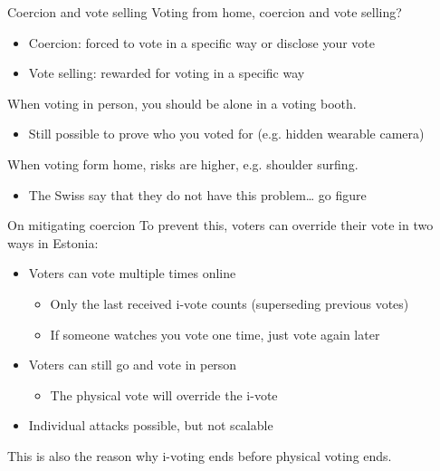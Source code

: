 \begin{frame}{Coercion and vote selling}
  Voting from home, coercion and vote selling?
  \begin{itemize}[<+(1)->]
    \item Coercion: forced to vote in a specific way or disclose your vote
    \item Vote selling: rewarded for voting in a specific way
  \end{itemize}

  \vspace*{1em}

  \pause
  When voting in person, you should be alone in a voting booth.
  \begin{itemize}[<+(1)->]
    \item Still possible to prove who you voted for (e.g. hidden wearable camera)
  \end{itemize}

  \vspace*{1em}

  \pause
  When voting form home, risks are higher, e.g. shoulder surfing.
  \begin{itemize}[<+(1)->]
    \item The Swiss say that they do not have this problem\dots{} go figure
  \end{itemize}
\end{frame}

\begin{frame}{On mitigating coercion}
  To prevent this, voters can override their vote in two ways in Estonia:
  \begin{itemize}[<+(1)->]
    \item Voters can vote multiple times online
    \begin{itemize}
      \item Only the last received i-vote counts (superseding previous votes)
      \item If someone watches you vote one time, just vote again later
    \end{itemize}
    \item Voters can still go and vote in person
    \begin{itemize}
      \item The physical vote will override the i-vote
    \end{itemize}
    \item Individual attacks possible, but not scalable
  \end{itemize}

  \pause
  This is also the reason why i-voting ends before physical voting ends.
\end{frame}


